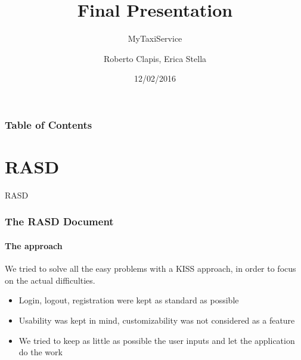 \documentclass[10pt,xcolor={usenames,dvipsnames}]{beamer}
\title{Final Presentation}
\subtitle{MyTaxiService}
\author{Roberto Clapis, Erica Stella}
\institute{Politecnico di Milano}
\date{12/02/2016}
\begin{document}
\frame{\titlepage}
\begin{frame}
	\frametitle{Table of Contents}
	\tableofcontents[currentsection]
\end{frame}


\section[Section]{RASD}

\begin{frame}
	\begin{center}
		RASD	
	\end{center}
\end{frame}
\begin{frame}
	\frametitle{The RASD Document}
	\framesubtitle{The approach}
	We tried to solve all the easy problems with a KISS approach, in order to focus on the actual difficulties. \\
	\begin{itemize}
		\item Login, logout, registration were kept as standard as possible
		\item Usability was kept in mind, customizability was not considered as a feature
		\item We tried to keep as little as possible the user inputs and let the application do the work
	\end{itemize}
\end{frame}
\end{document}
